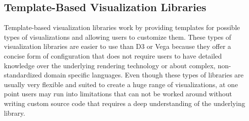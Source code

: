 





\subsection{Template-Based Visualization Libraries}

Template-based visualization libraries work by providing templates for possible types of visualizations and allowing users to customize them. These types of visualization libraries are easier to use than D3 or Vega because they offer a concise form of configuration that does not require users to have detailed knowledge over the underlying rendering technology or about complex, non-standardized domain specific languages. Even though these types of libraries are usually very flexible and suited to create a huge range of visualizations, at one point users may run into limitations that can not be worked around without writing custom source code that requires a deep understanding of the underlying library. 

